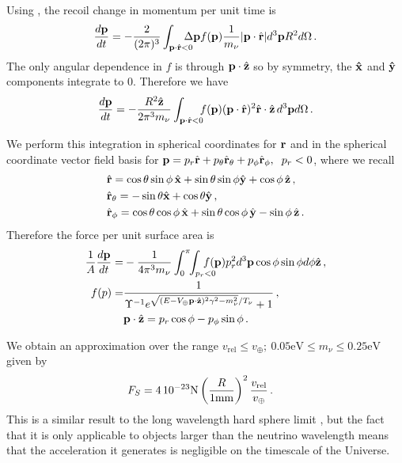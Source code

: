 Using , the recoil change in momentum per unit time is  
\begin{equation}
\frac{d{\bf p}}{dt}= -\frac{2}{(2\pi)^3}\int_{{\bf p}\cdot \hat{\bf r}<0} \!\!\!\!\!\!\Delta {\bf p}  f({\bf p}) \frac{1}{m_\nu}|{\bf p}\cdot \hat{\bf r}| d^3{\bf p}R^2d\Omega\,.
\end{equation}
The only angular dependence in $f$ is through ${\bf p}\cdot \hat {\bf z}$ so by symmetry, the ${\bf \hat x}$ and ${\bf \hat y}$ components integrate to $0$.  Therefore we have
\begin{equation}
\frac{d{\bf p}}{dt}=-\frac{R^2\hat{\bf z}}{2\pi^3m_\nu}\int_{{\bf p}\cdot \hat{\bf r}<0}\!\!\!   f({\bf p}) ({\bf p}\cdot \hat{\bf r})^2 \hat {\bf r}\cdot\hat{\bf z}\, d^3{\bf p}d\Omega\,.  
\end{equation}

We perform this integration in spherical coordinates for ${\bf r}$ and in the spherical coordinate vector field basis for ${\bf p}=p_r\hat{\bf r} +p_\theta\hat{\bf r}_\theta+p_\phi\hat{\bf r}_\phi,\hspace{2mm} p_r<0$, where we recall
\begin{align}
&\hat{\bf r}=\cos  \theta \sin \phi \, \hat{\bf x}+\sin \theta \sin \phi \hat{\bf y}+\cos  \phi\,\hat{\bf z}\notag\,,\\
&\hat{\bf r}_\theta=-\sin \theta \hat{\bf x}+\cos \theta \hat{\bf y}\,,\\
&\hat{\bf r}_\phi=\cos \theta \cos \phi\,\hat{\bf x}+\sin \theta \cos \phi \,\hat{\bf y}-\sin \phi \, \hat{\bf z}\notag\,.
\end{align}
Therefore the force per unit surface area is
\begin{align}\label{drag_eq}
\frac{1}{A}\frac{d{\bf p}}{dt}=&-\frac{1}{4\pi^3 m_\nu}\int_0^\pi\!\!\int_{p_r<0}\!\!\!\!\!\!\!\! f({\bf p}) p_r^2  d^3{\bf p}\cos \phi \sin \phi  d\phi\hat{\bf z}\,,\notag\\
f({\bf}p)=&\frac{1}{  \Upsilon^{-1}e^{\sqrt{( E-V_\oplus {\bf p}\cdot \hat {\bf z})^2\gamma^2-m_\nu^2}/T_\nu}+1 }\,,\\
          &{\bf p}\cdot\hat{\bf z}=p_r\cos \phi-p_\phi\sin\phi \,.\notag
\end{align}

We obtain an approximation over the range $v_{\text{rel}}\leq v_\oplus ;\ 0.05\text{eV}\leq m_\nu\leq 0.25\text{eV}$ given by
\begin{align}\label{drag_fit}
&F_S =  4\,10^{-23} \text{N}\left(\frac{R}{1{\rm mm}}\right)^2\frac{v_{\text{rel}}}{ v_\oplus}\,.
\end{align}
This is a similar result to the long wavelength hard sphere limit , but the fact that it is only applicable to objects larger than the neutrino wavelength means that the acceleration it generates is negligible on the timescale of the Universe.


